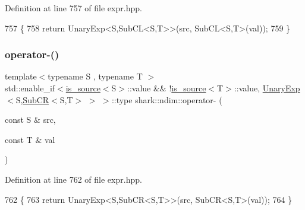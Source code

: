 Definition at line 757 of file expr.\+hpp.


\begin{DoxyCode}
757                                                                                                            
                                    \{
758             \textcolor{keywordflow}{return} UnaryExp<S,SubCL<S,T>>(src, SubCL<S,T>(val));
759         \}
\end{DoxyCode}
\hypertarget{namespaceshark_1_1ndim_aaad5819052035e9b59b06130b328f9aa}{}\label{namespaceshark_1_1ndim_aaad5819052035e9b59b06130b328f9aa} 
\subsubsection{\texorpdfstring{operator-\/()}{operator-()}\hspace{0.1cm}{\footnotesize\ttfamily [7/8]}}
{\footnotesize\ttfamily template$<$typename S , typename T $>$ \\
std\+::enable\+\_\+if$<$\hyperlink{classshark_1_1ndim_1_1is__source}{is\+\_\+source}$<$S$>$\+::value \&\& !\hyperlink{classshark_1_1ndim_1_1is__source}{is\+\_\+source}$<$T$>$\+::value, \hyperlink{classshark_1_1ndim_1_1_unary_exp}{Unary\+Exp}$<$S,\hyperlink{classshark_1_1ndim_1_1_sub_c_r}{Sub\+CR}$<$S,T$>$ $>$ $>$\+::type shark\+::ndim\+::operator-\/ (\begin{DoxyParamCaption}\item[{const S \&}]{src,  }\item[{const T \&}]{val }\end{DoxyParamCaption})}



Definition at line 762 of file expr.\+hpp.


\begin{DoxyCode}
762                                                                                                            
                                    \{
763             \textcolor{keywordflow}{return} UnaryExp<S,SubCR<S,T>>(src, SubCR<S,T>(val));
764         \}
\end{DoxyCode}
\hypertarget{namespaceshark_1_1ndim_addbe22a064a520607db0585dd2212284}{}\label{namespaceshark_1_1ndim_addbe22a064a520607db0585dd2212284} 
